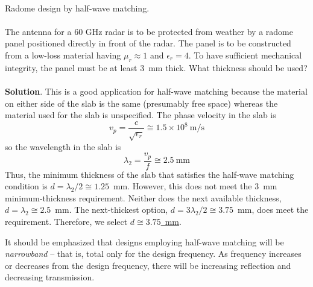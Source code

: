 ~\\ \begin{example} 
\begin{mdframed}[backgroundcolor=brown!20,linecolor=brown!20]\raggedright
Radome design by half-wave matching.
\\~\\
The antenna for a 60 GHz radar is to be protected from weather by a radome panel positioned directly in front of the radar.  The panel is to be constructed from a low-loss material having $\mu_r\approx 1$ and $\epsilon_r=4$.  To have sufficient mechanical integrity, the panel must be at least 3~mm thick.  What thickness should be used?\\
~\\       

\noindent
{\bf Solution}. This is a good application for half-wave matching because the material on either side of the slab is the same (presumably free space) whereas the material used for the slab is unspecified.  The phase velocity in the slab is
%
\begin{equation}
v_p = \frac{c}{\sqrt{\epsilon_r}} 
\cong 1.5 \times 10^8~\mbox{m/s}
\end{equation}  
%
so the wavelength in the slab is 
%
\begin{equation}
\lambda_2 = \frac{v_p}{f} 
\cong 2.5~\mbox{mm}
\end{equation}  
%
Thus, the minimum thickness of the slab that satisfies the half-wave matching condition is $d=\lambda_2/2 \cong 1.25$~mm. However, this does not meet the $3$~mm minimum-thickness requirement.  Neither does the next available thickness, $d=\lambda_2\cong 2.5$~mm.  The next-thickest option, $d=3\lambda_2/2\cong 3.75$~mm, does meet the requirement. 
Therefore, we select \underline{$d\cong 3.75$~mm}.
\end{mdframed}
\end{example}

It should be emphasized that designs employing half-wave matching will be {\it narrowband} -- that is, total only for the design frequency.  
As frequency increases or decreases from the design frequency, there will be increasing reflection and decreasing transmission.


